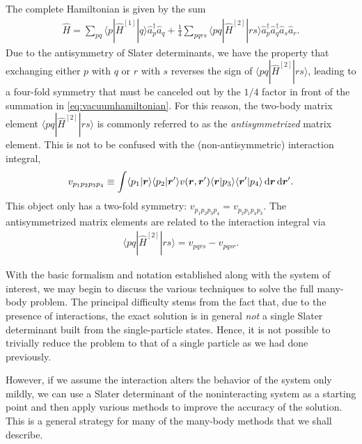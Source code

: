 The complete Hamiltonian is given by the sum
\begin{align}
  \hat{H} = \sum_{p q} \langle p | \hat{H}^{[1]} | q \rangle \hat{a}_p^\dagger \hat{a}_q + \frac{1}{4} \sum_{p q r s} \langle p q | \hat{H}^{[2]} | r s \rangle \hat{a}_p^\dagger \hat{a}_q^\dagger \hat{a}_s \hat{a}_r. \label{eq:vacuumhamiltonian}
\end{align}
Due to the antisymmetry of Slater determinants, we have the property that exchanging either $p$ with $q$ or $r$ with $s$ reverses the sign of $\langle p q | \hat{H}^{[2]} | r s \rangle$, leading to a four-fold symmetry that must be canceled out by the $1/4$ factor in front of the summation in \eqref{eq:vacuumhamiltonian}.  For this reason, the two-body matrix element $\langle p q | \hat{H}^{[2]} | r s \rangle$ is commonly referred to as the \emph{antisymmetrized} matrix element.  This is not to be confused with the (non-antisymmetric) interaction integral,
\begin{align} \label{eq:interactionintegral}
  v_{p_1 p_2 p_3 p_4} \equiv \int \langle p_1 | \bm{r} \rangle \langle p_2 | \bm{r}' \rangle v(\bm r, \bm r') \langle \bm{r} | p_3 \rangle \langle \bm{r}' | p_4 \rangle \operatorname{d\!} \bm{r} \operatorname{d\!} \bm{r}'.
\end{align}
This object only has a two-fold symmetry: $v_{p_1 p_2 p_3 p_4} = v_{p_2 p_1 p_4 p_3}$.  The antisymmetrized matrix elements are related to the interaction integral via
\begin{align} \label{eq:antisymmetricmatrixelement}
  \langle p q | \hat{H}^{[2]} | r s \rangle = v_{p q r s} - v_{p q s r}.
\end{align}

With the basic formalism and notation established along with the system of interest, we may begin to discuss the various techniques to solve the full many-body problem.  The principal difficulty stems from the fact that, due to the presence of interactions, the exact solution is in general \emph{not} a single Slater determinant built from the single-particle states.  Hence, it is not possible to trivially reduce the problem to that of a single particle as we had done previously.

However, if we assume the interaction alters the behavior of the system only mildly, we can use a Slater determinant of the noninteracting system as a starting point and then apply various methods to improve the accuracy of the solution.  This is a general strategy for many of the many-body methods that we shall describe.


